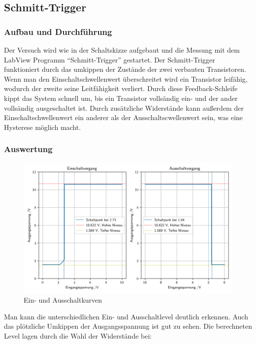 \documentclass[12pt,twoside,a4paper]{scrartcl}
\begin{document}
    \subsection{Schmitt-Trigger}

			\subsubsection{Aufbau und Durchführung}
				Der Versuch wird wie in der Schaltskizze aufgebaut und die Messung mit dem LabView Programm \enquote{Schmitt-Trigger} gestartet.
				Der Schmitt-Trigger funktioniert durch das umkippen der Zustände der zwei verbauten Transistoren. Wenn man den Einschaltschwellenwert überschreitet wird ein Transistor leifähig, wodurch der zweite seine Leitfähigkeit verliert. Durch diese Feedback-Schleife kippt das System schnell um, bis ein Transistor vollsändig ein- und der ander vollsändig ausgeschaltet ist. Durch zusätzliche Widerstände kann außerdem der Einschaltschwellenwert ein anderer als der Ausschaltscwellenwert sein, was eine Hysterese möglich macht.

			\subsubsection{Auswertung}

			\begin{figure}
				\includegraphics{Plots/schmitt/schmitt_trigger}
				\caption{Ein- und Ausschaltkurven}
				\label{Schmitt}
			\end{figure}

			Man kann die unterschiedlichen Ein- und Ausschaltlevel deutlich erkennen. Auch das plötzliche Umkippen der Ausgangsspannung ist gut zu sehen.
			Die berechneten Level lagen durch die Wahl der Widerstände bei:
\end{document}
